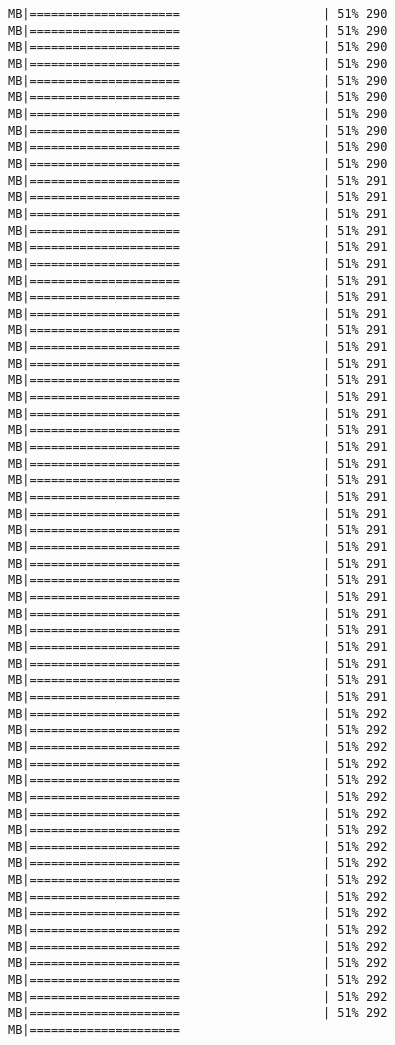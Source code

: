 \documentclass[
]{article}
\begin{document}
\begin{verbatim}
MB|=====================                    | 51% 290 MB|=====================                    | 51% 290 MB|=====================                    | 51% 290 MB|=====================                    | 51% 290 MB|=====================                    | 51% 290 MB|=====================                    | 51% 290 MB|=====================                    | 51% 290 MB|=====================                    | 51% 290 MB|=====================                    | 51% 290 MB|=====================                    | 51% 290 MB|=====================                    | 51% 291 MB|=====================                    | 51% 291 MB|=====================                    | 51% 291 MB|=====================                    | 51% 291 MB|=====================                    | 51% 291 MB|=====================                    | 51% 291 MB|=====================                    | 51% 291 MB|=====================                    | 51% 291 MB|=====================                    | 51% 291 MB|=====================                    | 51% 291 MB|=====================                    | 51% 291 MB|=====================                    | 51% 291 MB|=====================                    | 51% 291 MB|=====================                    | 51% 291 MB|=====================                    | 51% 291 MB|=====================                    | 51% 291 MB|=====================                    | 51% 291 MB|=====================                    | 51% 291 MB|=====================                    | 51% 291 MB|=====================                    | 51% 291 MB|=====================                    | 51% 291 MB|=====================                    | 51% 291 MB|=====================                    | 51% 291 MB|=====================                    | 51% 291 MB|=====================                    | 51% 291 MB|=====================                    | 51% 291 MB|=====================                    | 51% 291 MB|=====================                    | 51% 291 MB|=====================                    | 51% 291 MB|=====================                    | 51% 291 MB|=====================                    | 51% 291 MB|=====================                    | 51% 291 MB|=====================                    | 51% 292 MB|=====================                    | 51% 292 MB|=====================                    | 51% 292 MB|=====================                    | 51% 292 MB|=====================                    | 51% 292 MB|=====================                    | 51% 292 MB|=====================                    | 51% 292 MB|=====================                    | 51% 292 MB|=====================                    | 51% 292 MB|=====================                    | 51% 292 MB|=====================                    | 51% 292 MB|=====================                    | 51% 292 MB|=====================                    | 51% 292 MB|=====================                    | 51% 292 MB|=====================                    | 51% 292 MB|=====================                    | 51% 292 MB|=====================                    | 51% 292 MB|=====================                    | 51% 292 MB|=====================                    | 51% 292 MB|===================== 
\end{verbatim}
\end{document}
